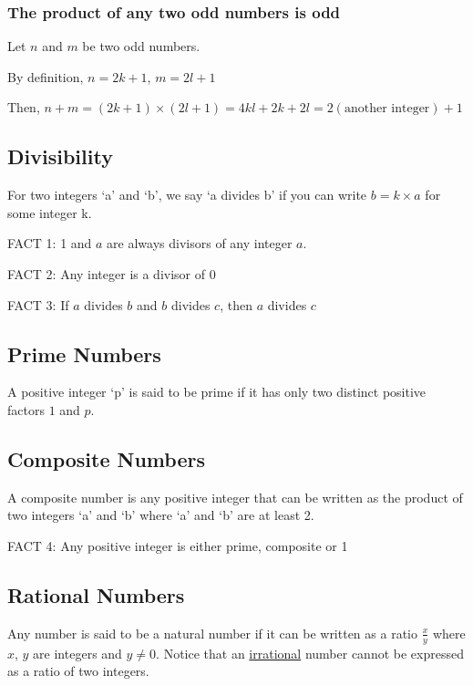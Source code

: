 \documentclass[12pt] {article}
\begin{document}
\subsubsection*{The product of any two odd numbers is odd}
\begin{center}
  Let $n$ and $m$ be two odd numbers.
\end{center}
\begin{center}
  By definition, $n=2k+1$, $m=2l+1$
\end{center}
\begin{center}
  Then, $n+m=(2k+1)\times(2l+1)=4kl+2k+2l=2(\text{another integer})+1$
\end{center}

\subsection*{Divisibility}
For two integers `a' and `b', we say `a divides b' if you can write $b=k\times a$ for some integer k.
\begin{center}
  FACT 1: 1 and $a$ are always divisors of any integer $a$.
\end{center}
\begin{center}
  FACT 2: Any integer is a divisor of 0 
\end{center}
\begin{center}
  FACT 3: If $a$ divides $b$ and $b$ divides $c$, then $a$ divides $c$ 
\end{center}

\subsection*{Prime Numbers}
A positive integer `p' is said to be prime if it has only two distinct positive factors $1$ and $p$.

\subsection*{Composite Numbers}
A composite number is any positive integer that can be written as the product of two integers `a'
and `b' where `a' and `b' are at least 2.

\begin{center}
  FACT 4: Any positive integer is either prime, composite or 1 
\end{center}

\subsection*{Rational Numbers}
Any number is said to be a natural number if it can be written as a ratio $\frac{x}{y}$ 
where $x$, $y$ are integers and $y \neq 0$. Notice that an \underline{irrational} number
cannot be expressed as a ratio of two integers.
\end{document}
